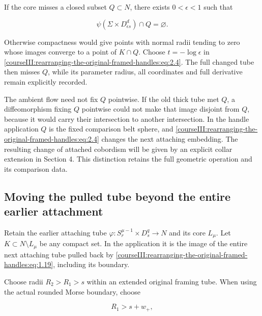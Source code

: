 If the core misses a closed subset \(Q\subset N\), there exists \(0<\epsilon<1\) such that

\begin{equation}
\psi(\Sigma\times D_{\epsilon s}^d)\cap Q=\varnothing.
\label{courseIII:rearranging-the-original-framed-handles:eq:2.8}
\end{equation}

Otherwise compactness would give points with normal radii tending to zero whose images converge to a point of \(K\cap Q\). Choose \(t=-\log\epsilon\) in \eqref{courseIII:rearranging-the-original-framed-handles:eq:2.4}. The full changed tube then misses \(Q\), while its parameter radius, all coordinates and full derivative remain explicitly recorded.

The ambient flow need not fix \(Q\) pointwise. If the old thick tube met \(Q\), a diffeomorphism fixing \(Q\) pointwise could not make that image disjoint from \(Q\), because it would carry their intersection to another intersection. In the handle application \(Q\) is the fixed comparison belt sphere, and \eqref{courseIII:rearranging-the-original-framed-handles:eq:2.4} changes the next attaching embedding. The resulting change of attached cobordism will be given by an explicit collar extension in Section 4. This distinction retains the full geometric operation and its comparison data.

\subsection{Moving the pulled tube beyond the entire earlier attachment}
\label{courseIII:rearranging-the-original-framed-handles:arrangement-outward-motion}

\label{courseIII:rearranging-the-original-framed-handles:section-3}\label{courseIII:handle-arrangement:3}

Retain the earlier attaching tube \(\varphi:S_r^{\mu-1}\times D_s^q\to N\) and its core \(L_\mu\). Let \(K\subset N\setminus L_\mu\) be any compact set. In the application it is the image of the entire next attaching tube pulled back by \eqref{courseIII:rearranging-the-original-framed-handles:eq:1.19}, including its boundary.

Choose radii \(R_2>R_1>s\) within an extended original framing tube. When using the actual rounded Morse boundary, choose

\begin{equation}
R_1>s+w_+,
\label{courseIII:rearranging-the-original-framed-handles:eq:3.1}
\end{equation}

